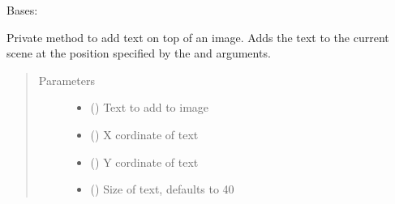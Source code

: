 \documentclass[letterpaper,10pt,english]{sphinxmanual}
\begin{document}

\begin{fulllineitems}
\label{\detokenize{polo.widgets:polo.widgets.slideshow_viewer.SlideshowViewer}}
Bases: {\hyperref[\detokenize{polo.widgets:polo.widgets.slideshow_viewer.PhotoViewer}]{}}

\begin{fulllineitems}
\label{\detokenize{polo.widgets:polo.widgets.slideshow_viewer.SlideshowViewer._add_text_to_scene}}
Private method to add text on top of an image. Adds the text to
the current scene at the position specified by the  and 
arguments.
\begin{quote}\begin{description}
\item[{Parameters}] \leavevmode\begin{itemize}
\item {} 
 () \textendash{} Text to add to image

\item {} 
 () \textendash{} X cordinate of text

\item {} 
 () \textendash{} Y cordinate of text

\item {} 
 (\sphinxstyleliteralemphasis{\sphinxupquote{, }}) \textendash{} Size of text, defaults to 40


\end{itemize}
\end{description}
\end{quote}
\end{fulllineitems}
\end{fulllineitems}
\end{document}
